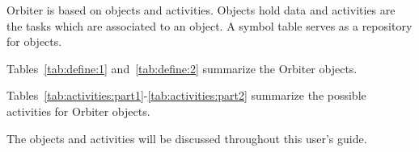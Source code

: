 Orbiter is based on objects and activities. 
Objects hold data and activities are the tasks which are associated to an object. 
A symbol table serves as a repository for objects.

\bigskip

Tables~\ref{tab:define:1} and~\ref{tab:define:2} summarize the Orbiter objects.


\bigskip


Tables~\ref{tab:activities:part1}-\ref{tab:activities:part2} 
summarize the possible activities for Orbiter objects. 


\bigskip

The objects and activities will be discussed throughout this user's guide.


\bigskip
